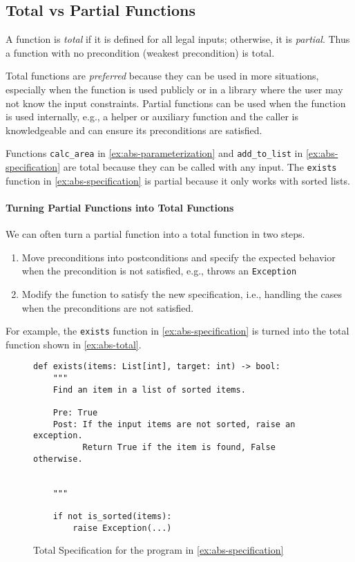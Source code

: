 \documentclass[oneside,11pt,dvipsnames]{book}
\newcommand{\code}[1]{\texttt{#1}}
\begin{document}
\subsection{Total vs Partial Functions}\label{sec:total-partial-function}

A function is \emph{total} if it is defined for all legal inputs; otherwise, it is \emph{partial}. Thus a function with no precondition (weakest precondition) is total.  

Total functions are \emph{preferred} because they can be used in more situations, especially when the function is used publicly or in a library where the user may not know the input constraints. Partial functions can be used when the function is used internally, e.g., a helper or auxiliary function and the caller is knowledgeable and can ensure its preconditions are satisfied.

Functions \code{calc\_area} in \autoref{ex:abs-parameterization} and \code{add\_to\_list} in \autoref{ex:abs-specification} are total because they can be called with any input. The \code{exists} function in \autoref{ex:abs-specification} is partial because it only works with sorted lists.


\paragraph{Turning Partial Functions into Total Functions} We can often turn a partial function into a total function in two steps. 
\begin{enumerate}
\item Move preconditions into postconditions and specify the expected behavior when the precondition is not satisfied, e.g., throws an \code{Exception}
\item Modify the function to satisfy the new specification, i.e., handling the cases when the preconditions are not satisfied. 
\end{enumerate}

For example, the \code{exists} function in \autoref{ex:abs-specification} is turned into the total function shown in \autoref{ex:abs-total}.

\begin{figure}
\begin{lstlisting}
def exists(items: List[int], target: int) -> bool:
    """
    Find an item in a list of sorted items.

    Pre: True
    Post: If the input items are not sorted, raise an exception.
          Return True if the item is found, False otherwise.


    """

    if not is_sorted(items):
        raise Exception(...)
\end{lstlisting}
\caption{Total Specification for the program in \autoref{ex:abs-specification}}\label{ex:abs-total}
\end{figure}
\end{document}
